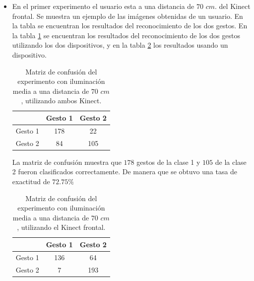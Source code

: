 \begin{itemize}

\item En el primer experimento el usuario esta a una distancia de $70$ $cm.$ del Kinect frontal. Se muestra un ejemplo de las imágenes obtenidas de un usuario. En la tabla se encuentran los resultados del reconocimiento de los dos gestos.  En la tabla \ref{table:70LMK2} se encuentran los resultados del reconocimiento de los dos gestos utilizando los dos dispositivos, y en la tabla \ref{table:70LMK1} los resultados usando un dispositivo.  


\begin{table}[h!] 
\begin{center}
\begin{tabular}{ r || c | c |}  
        & Gesto 1 & Gesto 2 \\ \hline \hline  
Gesto 1 & 178    &  22     \\ \hline  
Gesto 2 & 84     & 105     \\   
\end{tabular}
\end{center} 
\caption{Matriz de confusión del experimento con iluminación media a una distancia de $70$ $cm$, utilizando ambos Kinect.}
\label{table:70LMK2}
\end{table}

La matriz de confusión muestra que $178$ gestos de la clase 1 y $105$ de la clase 2 fueron clasificados correctamente. De manera que se obtuvo una tasa de exactitud de $72.75 \%$ 

\begin{table}[h!] 
\begin{center}
\begin{tabular}{ r || c | c |} 
        & Gesto 1 & Gesto 2 \\ \hline \hline  
Gesto 1 & 136    &  64     \\ \hline  
Gesto 2 & 7     &  193     \\   
\end{tabular}
\end{center} 
\caption{Matriz de confusión del experimento con iluminación media a una distancia de $70$ $cm$, utilizando el Kinect frontal.} 
\label{table:70LMK1}
\end{table} 


\end{itemize}

